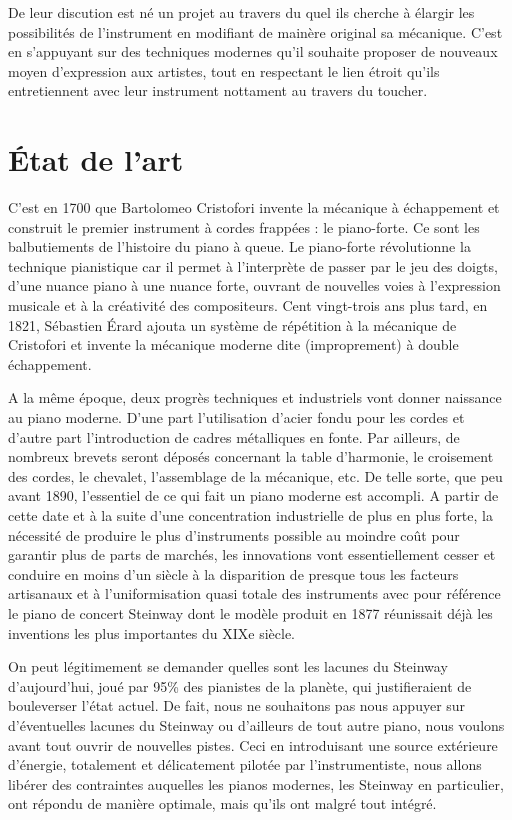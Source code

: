 \documentclass[french,a4paper,12pt]{report}
\begin{document}
  De leur discution est né un projet au travers du quel ils cherche à élargir les possibilités de l'instrument en modifiant de mainère original sa mécanique. C'est en s'appuyant sur des techniques modernes qu'il souhaite proposer de nouveaux moyen d'expression aux artistes, tout en respectant le lien étroit qu'ils entretiennent avec leur instrument nottament au travers du toucher.
  
  \section{État de l'art}
  
  C’est en 1700 que Bartolomeo Cristofori invente la mécanique à échappement et construit le premier instrument à cordes frappées : le piano-forte. Ce sont les balbutiements de l’histoire du piano à queue. Le piano-forte révolutionne la technique pianistique car il permet à l’interprète de passer par le jeu des doigts, d’une nuance piano à une nuance forte, ouvrant de nouvelles voies à l’expression musicale et à la créativité des compositeurs. Cent vingt-trois ans plus tard, en 1821, Sébastien Érard ajouta un système de répétition à la mécanique de Cristofori et invente la mécanique moderne dite (improprement) à double échappement.

A la même époque, deux progrès techniques et industriels vont donner naissance au piano moderne. D’une part l’utilisation d’acier fondu pour les cordes et d’autre part l’introduction de cadres métalliques en fonte. Par ailleurs, de nombreux brevets seront déposés concernant la table d’harmonie, le croisement des cordes, le chevalet, l’assemblage de la mécanique, etc. 
De telle sorte, que peu avant 1890, l’essentiel de ce qui fait un piano moderne est accompli. A partir de cette date et à la suite d’une concentration industrielle de plus en plus forte, la nécessité de produire le plus d’instruments possible au moindre coût pour garantir plus de parts de marchés, les innovations vont essentiellement cesser et conduire en moins d’un siècle à la disparition de presque tous les facteurs artisanaux et à l’uniformisation quasi totale des instruments avec pour référence le piano de concert Steinway dont le modèle produit en 1877 réunissait déjà les inventions les plus importantes du XIXe siècle.

On peut légitimement se demander quelles sont les lacunes du Steinway d’aujourd’hui, joué par 95\% des pianistes de la planète, qui justifieraient de bouleverser l’état actuel.
De fait, nous ne souhaitons pas nous appuyer sur d’éventuelles lacunes du Steinway ou d’ailleurs de tout autre piano, nous voulons avant tout ouvrir de nouvelles pistes. 
 Ceci en introduisant une source extérieure d’énergie, totalement et délicatement pilotée par l’instrumentiste, nous allons libérer des contraintes auquelles les pianos modernes, les Steinway en particulier, ont répondu de manière optimale, mais qu’ils ont malgré tout intégré.
 
\end{document}
